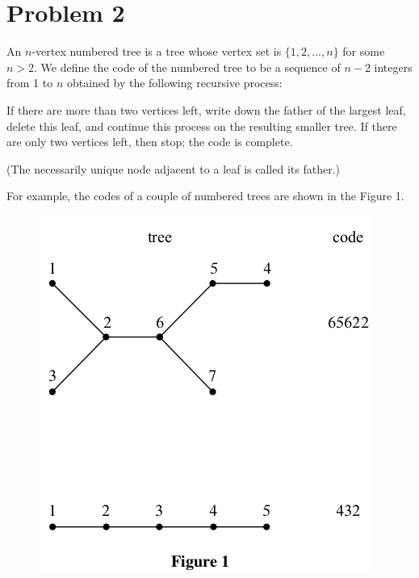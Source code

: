 \documentclass[14pt]{extarticle}
\begin{document}
\section{Problem 2}
An $n$-vertex numbered tree is a tree whose vertex set is $\{1, 2, \ldots, n\}$ for some $n > 2$. We define the code of the numbered tree to be a sequence of $n - 2$ integers from 1 to $n$ obtained by the following recursive process:

If there are more than two vertices left, write down the father of the largest leaf, delete this leaf, and continue this process on the resulting smaller tree. If there are only two vertices left, then stop; the code is complete.

(The necessarily unique node adjacent to a leaf is called its father.)

For example, the codes of a couple of numbered trees are shown in the Figure 1.

\begin{figure}[ht!]
\centering
\includegraphics[scale=0.5]{numbered-tree.png}
\end{figure}
\end{document}
